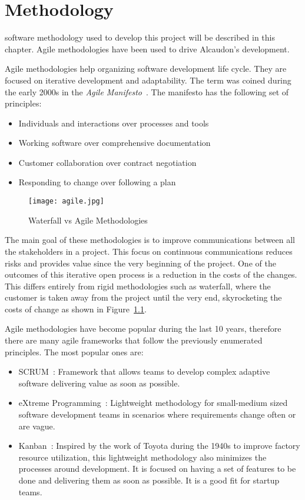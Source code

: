 \chapter{Methodology}
\label{chap:methodology}

 software methodology used to develop this project will be described in this
chapter. Agile methodologies have been used to drive Alcaudon's development.

Agile methodologies help organizing software development life cycle. They are
focused on iterative development and adaptability. The term was coined during
the early 2000s in the \textit{Agile Manifesto}~\cite{manifesto}. The manifesto
has the following set of principles:

\begin{itemize}
\item Individuals and interactions over processes and tools
\item Working software over comprehensive documentation
\item Customer collaboration over contract negotiation
\item Responding to change over following a plan
\end{itemize}


\begin{figure}
  \centering
  \texttt{[image: agile.jpg]}
  \caption{Waterfall vs Agile Methodologies~\cite{waterfall}}
  \label{fig:waterfall}
\end{figure}

The main goal of these methodologies is to improve communications between all
the stakeholders in a project. This focus on continuous communications reduces
risks and provides value since the very beginning of the project. One of the
outcomes of this iterative open process is a reduction in the costs of the
changes. This differs entirely from rigid methodologies such as waterfall, where
the customer is taken away from the project until the very end, skyrocketing
the costs of change as shown in Figure~\ref{fig:waterfall}.

Agile methodologies have become popular during the last 10 years, therefore there
are many agile frameworks that follow the previously enumerated principles. The
most popular ones are:
\begin{itemize}
\item SCRUM~\cite{scrum}: Framework that allows teams to develop complex
  adaptive software delivering value as soon as possible.
\item eXtreme Programming~\cite{xp}: Lightweight methodology for small-medium
  sized software development teams in scenarios where requirements change often
  or are vague.
\item Kanban~\cite{kanban}: Inspired by the work of Toyota during the 1940s to improve
  factory resource utilization, this lightweight methodology also minimizes the processes
  around development. It is focused on having a set of features to be done and delivering
  them as soon as possible. It is a good fit for startup teams.
\end{itemize}

